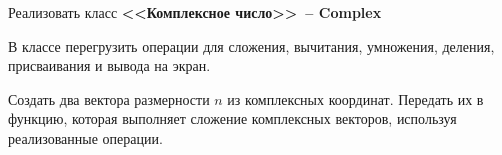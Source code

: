Реализовать класс \textbf{<<Комплексное число>>~-- Complex}

В классе перегрузить операции для сложения,
вычитания, умножения, деления, присваивания и вывода на экран.

Создать два вектора
размерности $n$ из комплексных координат. Передать их в функцию, которая выполняет
сложение комплексных векторов, используя реализованные операции.
